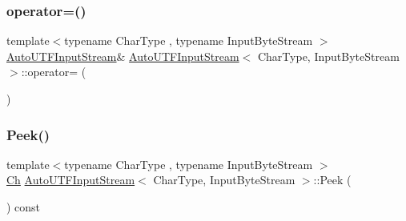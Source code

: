 \mbox{\label{classAutoUTFInputStream_a043b85d05491e8908611054b37aec38b}} 
\subsubsection{\texorpdfstring{operator=()}{operator=()}}
{\footnotesize\ttfamily template$<$typename Char\+Type , typename Input\+Byte\+Stream $>$ \\
\hyperlink{classAutoUTFInputStream}{Auto\+U\+T\+F\+Input\+Stream}\& \hyperlink{classAutoUTFInputStream}{Auto\+U\+T\+F\+Input\+Stream}$<$ Char\+Type, Input\+Byte\+Stream $>$\+::operator= (\begin{DoxyParamCaption}\item[{const \hyperlink{classAutoUTFInputStream}{Auto\+U\+T\+F\+Input\+Stream}$<$ Char\+Type, Input\+Byte\+Stream $>$ \&}]{ }\end{DoxyParamCaption})\hspace{0.3cm}{\ttfamily [private]}}

\mbox{\label{classAutoUTFInputStream_a616fbe24878a2026fbc7743acb50438c}} 
\subsubsection{\texorpdfstring{Peek()}{Peek()}}
{\footnotesize\ttfamily template$<$typename Char\+Type , typename Input\+Byte\+Stream $>$ \\
\hyperlink{classAutoUTFInputStream_a3bb3eb46f2c20404a7ac21963cfe348f}{Ch} \hyperlink{classAutoUTFInputStream}{Auto\+U\+T\+F\+Input\+Stream}$<$ Char\+Type, Input\+Byte\+Stream $>$\+::Peek (\begin{DoxyParamCaption}{ }\end{DoxyParamCaption}) const\hspace{0.3cm}{\ttfamily [inline]}}

\mbox{\label{classAutoUTFInputStream_a5ea730d1ab715f58ce4f9e3dcd77810a}} 
